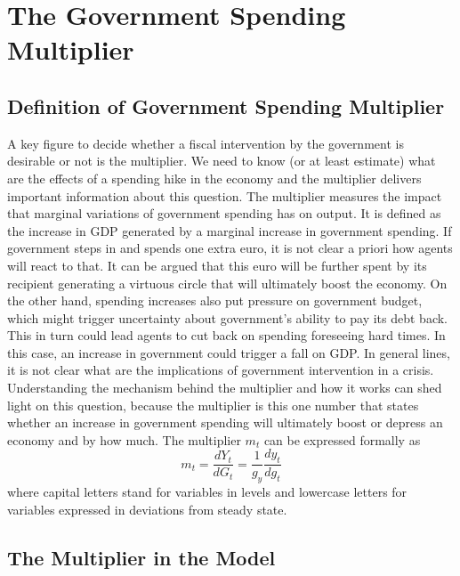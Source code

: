 %


\section{The Government Spending Multiplier}

\subsection*{Definition of Government Spending Multiplier}

A key figure to decide whether a fiscal intervention by the government is desirable or not is the multiplier. We need to know (or at least estimate) what are the effects of a spending hike in the economy and the multiplier delivers important information about this question. The multiplier measures the impact that marginal variations of government spending has on output. It is defined as the increase in GDP generated by a marginal increase in government spending. If government steps in and spends one extra euro, it is not clear a priori how agents will react to that. It can be argued that this euro will be further spent by its recipient generating a virtuous circle that will ultimately boost the economy. On the other hand, spending increases also put pressure on government budget, which might trigger uncertainty about government's ability to pay its debt back. This in turn could lead agents to cut back on spending foreseeing hard times. In this case, an increase in government could trigger a fall on GDP.  In general lines, it is not clear what are the implications of government intervention in a crisis. Understanding the mechanism behind the multiplier and how it works can shed light on this question, because the multiplier is this one number that states whether an increase in government spending will ultimately boost or depress an economy and by how much. The multiplier $m_t$ can be expressed formally as
\begin{equation}
  m_t = \frac{dY_t}{dG_t} = \frac{1}{g_y}\frac{dy_t}{dg_t} \nonumber
\end{equation}
where capital letters stand for variables in levels and lowercase letters for variables expressed in deviations from steady state.

\subsection*{The Multiplier in the Model}

